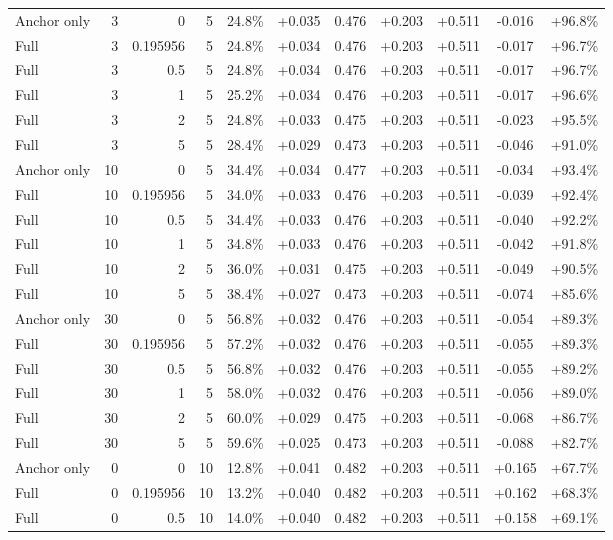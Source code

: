 \begin{table}[htbp]
\begin{tabular}{lrrrccccccc}
Anchor only & 3 & 0 & 5 & 24.8\% & +0.035 & 0.476 & +0.203 & +0.511 & -0.016 & +96.8\% \\
Full & 3 & 0.195956 & 5 & 24.8\% & +0.034 & 0.476 & +0.203 & +0.511 & -0.017 & +96.7\% \\
Full & 3 & 0.5 & 5 & 24.8\% & +0.034 & 0.476 & +0.203 & +0.511 & -0.017 & +96.7\% \\
Full & 3 & 1 & 5 & 25.2\% & +0.034 & 0.476 & +0.203 & +0.511 & -0.017 & +96.6\% \\
Full & 3 & 2 & 5 & 24.8\% & +0.033 & 0.475 & +0.203 & +0.511 & -0.023 & +95.5\% \\
Full & 3 & 5 & 5 & 28.4\% & +0.029 & 0.473 & +0.203 & +0.511 & -0.046 & +91.0\% \\
Anchor only & 10 & 0 & 5 & 34.4\% & +0.034 & 0.477 & +0.203 & +0.511 & -0.034 & +93.4\% \\
Full & 10 & 0.195956 & 5 & 34.0\% & +0.033 & 0.476 & +0.203 & +0.511 & -0.039 & +92.4\% \\
Full & 10 & 0.5 & 5 & 34.4\% & +0.033 & 0.476 & +0.203 & +0.511 & -0.040 & +92.2\% \\
Full & 10 & 1 & 5 & 34.8\% & +0.033 & 0.476 & +0.203 & +0.511 & -0.042 & +91.8\% \\
Full & 10 & 2 & 5 & 36.0\% & +0.031 & 0.475 & +0.203 & +0.511 & -0.049 & +90.5\% \\
Full & 10 & 5 & 5 & 38.4\% & +0.027 & 0.473 & +0.203 & +0.511 & -0.074 & +85.6\% \\
Anchor only & 30 & 0 & 5 & 56.8\% & +0.032 & 0.476 & +0.203 & +0.511 & -0.054 & +89.3\% \\
Full & 30 & 0.195956 & 5 & 57.2\% & +0.032 & 0.476 & +0.203 & +0.511 & -0.055 & +89.3\% \\
Full & 30 & 0.5 & 5 & 56.8\% & +0.032 & 0.476 & +0.203 & +0.511 & -0.055 & +89.2\% \\
Full & 30 & 1 & 5 & 58.0\% & +0.032 & 0.476 & +0.203 & +0.511 & -0.056 & +89.0\% \\
Full & 30 & 2 & 5 & 60.0\% & +0.029 & 0.475 & +0.203 & +0.511 & -0.068 & +86.7\% \\
Full & 30 & 5 & 5 & 59.6\% & +0.025 & 0.473 & +0.203 & +0.511 & -0.088 & +82.7\% \\
Anchor only & 0 & 0 & 10 & 12.8\% & +0.041 & 0.482 & +0.203 & +0.511 & +0.165 & +67.7\% \\
Full & 0 & 0.195956 & 10 & 13.2\% & +0.040 & 0.482 & +0.203 & +0.511 & +0.162 & +68.3\% \\
Full & 0 & 0.5 & 10 & 14.0\% & +0.040 & 0.482 & +0.203 & +0.511 & +0.158 & +69.1\% \\

\end{tabular}
\end{table}
